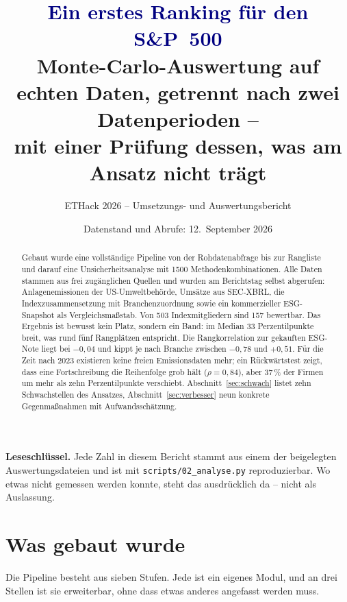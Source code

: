 \documentclass[11pt,a4paper]{article}
\title{\textcolor{navy}{Ein erstes Ranking für den S\&P~500}\\[4mm]
\large Monte-Carlo-Auswertung auf echten Daten, getrennt nach zwei Datenperioden --\\
mit einer Prüfung dessen, was am Ansatz nicht trägt}
\author{ETHack 2026 -- Umsetzungs- und Auswertungsbericht}
\date{Datenstand und Abrufe: 12.~September 2026}
\newcommand{\befund}[1]{%
  \par\vspace{2pt}\noindent\colorbox{softgrey}{%
  \begin{minipage}{\dimexpr\linewidth-2\fboxsep}\small\vspace{3pt}#1\vspace{3pt}\end{minipage}}\par\vspace{4pt}}
\begin{document}
\maketitle

\begin{abstract}
\noindent
Gebaut wurde eine vollständige Pipeline von der Rohdatenabfrage bis zur Rangliste und darauf eine Unsicherheitsanalyse mit 1500 Methodenkombinationen. Alle Daten stammen aus frei zugänglichen Quellen und wurden am Berichtstag selbst abgerufen: Anlagenemissionen der US-Umweltbehörde, Umsätze aus SEC-XBRL, die Indexzusammensetzung mit Branchenzuordnung sowie ein kommerzieller ESG-Snapshot als Vergleichsmaßstab. Von 503 Indexmitgliedern sind 157 bewertbar. Das Ergebnis ist bewusst kein Platz, sondern ein Band: im Median 33 Perzentilpunkte breit, was rund fünf Rangplätzen entspricht. Die Rangkorrelation zur gekauften ESG-Note liegt bei $-0{,}04$ und kippt je nach Branche zwischen $-0{,}78$ und $+0{,}51$. Für die Zeit nach 2023 existieren keine freien Emissionsdaten mehr; ein Rückwärtstest zeigt, dass eine Fortschreibung die Reihenfolge grob hält ($\rho = 0{,}84$), aber 37\,\% der Firmen um mehr als zehn Perzentilpunkte verschiebt. Abschnitt~\ref{sec:schwach} listet zehn Schwachstellen des Ansatzes, Abschnitt~\ref{sec:verbesser} neun konkrete Gegenmaßnahmen mit Aufwandsschätzung.
\end{abstract}

\vspace{2mm}
\befund{\textbf{Leseschlüssel.} Jede Zahl in diesem Bericht stammt aus einem der beigelegten Auswertungsdateien und ist mit \texttt{scripts/02\_analyse.py} reproduzierbar. Wo etwas nicht gemessen werden konnte, steht das ausdrücklich da -- nicht als Auslassung.}

\tableofcontents
\newpage

\section{Was gebaut wurde}

Die Pipeline besteht aus sieben Stufen. Jede ist ein eigenes Modul, und an drei Stellen ist sie erweiterbar, ohne dass etwas anderes angefasst werden muss.
\end{document}
